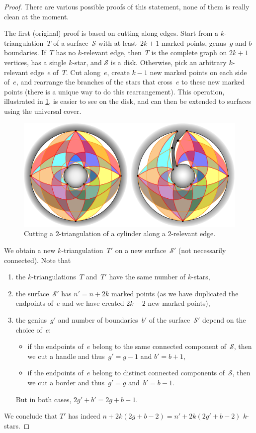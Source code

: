 \documentclass{amsart}
\theoremstyle{remark}
\newcommand{\surface}{\mathcal{S}}
\begin{document}
\begin{proof}
There are various possible proofs of this statement, none of them is really clean at the moment.

The first (original) proof is based on cutting along edges.
Start from a $k$-triangulation~$T$ of a surface~$\surface$ with at least~$2k+1$ marked points, genus~$g$ and $b$ boundaries.
If~$T$ has no $k$-relevant edge, then~$T$ is the complete graph on $2k+1$ vertices, has a single $k$-star, and $\surface$ is a disk.
Otherwise, pick an arbitrary $k$-relevant edge~$e$ of~$T$.
Cut along~$e$, create $k-1$ new marked points on each side of~$e$, and rearrange the branches of the stars that cross~$e$ to these new marked points (there is a unique way to do this rearrangement).
This operation, illustrated in \cref{fig:cutSurface}, is easier to see on the disk, and can then be extended to surfaces using the universal cover.
%
\begin{figure}[t]
	\capstart
	\centerline{\includegraphics[scale=.5]{2triangCylinderCut}}
	\caption{Cutting a $2$-triangulation of a cylinder along a $2$-relevant edge.}
	\label{fig:cutSurface}
\end{figure}
%
We obtain a new $k$-triangulation~$T'$ on a new surface~$\surface'$ (not necessarily connected).
Note that
\begin{enumerate}
\item the $k$-triangulations~$T$ and~$T'$ have the same number of $k$-stars,
\item the surface~$\surface'$ has $n' = n+2k$ marked points (as we have duplicated the endpoints of~$e$ and we have created $2k-2$ new marked points),
\item the genius~$g'$ and number of boundaries~$b'$ of the surface~$\surface'$ depend on the choice of~$e$:
	\begin{itemize}
	\item if the endpoints of~$e$ belong to the same connected component of~$\surface$, then we cut a handle and thus~$g' = g-1$ and $b' = b+1$,
	\item if the endpoints of~$e$ belong to distinct connected components of~$\surface$, then we cut a border and thus~$g' = g$ and~$b' = b-1$.
	\end{itemize}
	But in both cases, $2g'+b' = 2g+b-1$.
\end{enumerate}
We conclude that $T'$ has indeed $n + 2k(2g + b -2) = n' + 2k(2g' + b - 2)$ $k$-stars.


\end{proof}
\end{document}

